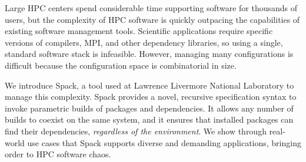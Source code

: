 
Large HPC centers spend considerable time supporting software for thousands of users, but the complexity of HPC software is quickly outpacing the capabilities of existing software management tools. Scientific applications require specific versions of compilers, MPI, and other dependency libraries, so using a single, standard software stack is infeasible.  However, managing many configurations is difficult because the configuration space is combinatorial in size.

We introduce Spack, a tool used at Lawrence Livermore National Laboratory to manage this complexity. Spack provides a novel, recursive specification syntax to invoke parametric builds of packages and dependencies.  It allows any number of builds to coexist on the same system, and it ensures that installed packages can find their dependencies, {\it regardless of the environment}. We show through real-world use cases that Spack supports diverse and demanding applications, bringing order to HPC software chaos.
